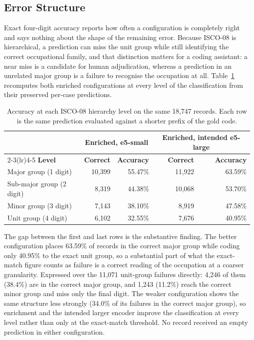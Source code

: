 \subsection{Error Structure}
\label{sec:res-error-structure}

Exact four-digit accuracy reports how often a configuration is completely
right and says nothing about the shape of the remaining error. Because
ISCO-08 is hierarchical, a prediction can miss the unit group while still
identifying the correct occupational family, and that distinction matters
for a coding assistant: a near miss is a candidate for human adjudication,
whereas a prediction in an unrelated major group is a failure to recognise
the occupation at all. Table~\ref{tab:ch6-error-levels} recomputes both
enriched configurations at every level of the classification from their
preserved per-case predictions.

\begin{table}[htbp]
\centering
\caption{Accuracy at each ISCO-08 hierarchy level on the same 18,747
records. Each row is the same prediction evaluated against a shorter prefix
of the gold code.}
\label{tab:ch6-error-levels}
\small\renewcommand{\arraystretch}{1.3}
\begin{tabular}{lrrrr}
\toprule
& \multicolumn{2}{c}{\textbf{Enriched, e5-small}} & \multicolumn{2}{c}{\textbf{Enriched, intended e5-large}} \\
\cmidrule(lr){2-3}\cmidrule(lr){4-5}
\textbf{Level} & \textbf{Correct} & \textbf{Accuracy} & \textbf{Correct} & \textbf{Accuracy} \\
\midrule
Major group (1 digit)     & 10,399 & 55.47\% & 11,922 & 63.59\% \\
Sub-major group (2 digit) &  8,319 & 44.38\% & 10,068 & 53.70\% \\
Minor group (3 digit)     &  7,143 & 38.10\% &  8,919 & 47.58\% \\
Unit group (4 digit)      &  6,102 & 32.55\% &  7,676 & 40.95\% \\
\bottomrule
\end{tabular}
\end{table}

The gap between the first and last rows is the substantive finding. The
better configuration places 63.59\% of records in the correct major group
while coding only 40.95\% to the exact unit group, so a substantial part of
what the exact-match figure counts as failure is a correct reading of the
occupation at a coarser granularity. Expressed over the 11,071 unit-group
failures directly: 4,246 of them (38.4\%) are in the correct major group,
and 1,243 (11.2\%) reach the correct minor group and miss only the final
digit. The weaker configuration shows the same structure less strongly
(34.0\% of its failures in the correct major group), so enrichment and the
intended larger encoder improve the classification at every level rather
than only at the exact-match threshold. No record received an empty
prediction in either configuration.

